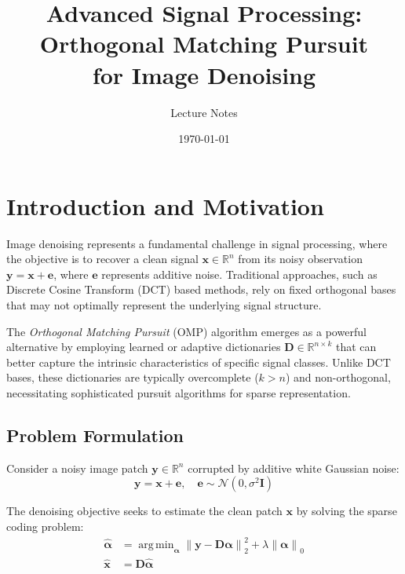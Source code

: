\documentclass[12pt]{article}
\title{Advanced Signal Processing: Orthogonal Matching Pursuit\\for Image Denoising}
\author{Lecture Notes}
\date{\today}
\renewcommand{\vec}[1]{\mathbf{#1}}
\DeclareMathOperator{\argmin}{arg\,min}
\newcommand{\norm}[1]{\left\|#1\right\|}
\theoremstyle{definition}
\begin{document}
\maketitle

\tableofcontents
\newpage


\section{Introduction and Motivation}
\label{sec:introduction}

Image denoising represents a fundamental challenge in signal processing, where the objective is to recover a clean signal $\vec{x} \in \mathbb{R}^n$ from its noisy observation $\vec{y} = \vec{x} + \vec{e}$, where $\vec{e}$ represents additive noise. Traditional approaches, such as Discrete Cosine Transform (DCT) based methods, rely on fixed orthogonal bases that may not optimally represent the underlying signal structure.

The \textit{Orthogonal Matching Pursuit} (OMP) algorithm emerges as a powerful alternative by employing learned or adaptive dictionaries $\mathbf{D} \in \mathbb{R}^{n \times k}$ that can better capture the intrinsic characteristics of specific signal classes. Unlike DCT bases, these dictionaries are typically overcomplete ($k > n$) and non-orthogonal, necessitating sophisticated pursuit algorithms for sparse representation.

\subsection{Problem Formulation}
\label{subsec:problem_formulation}

Consider a noisy image patch $\vec{y} \in \mathbb{R}^n$ corrupted by additive white Gaussian noise:
\begin{equation}
    \vec{y} = \vec{x} + \vec{e}, \quad \vec{e} \sim \mathcal{N}(0, \sigma^2 \mathbf{I})
\end{equation}

The denoising objective seeks to estimate the clean patch $\vec{x}$ by solving the sparse coding problem:
\begin{align}
    \hat{\vec{\alpha}} & = \argmin_{\vec{\alpha}} \norm{\vec{y} - \mathbf{D}\vec{\alpha}}_2^2 + \lambda \norm{\vec{\alpha}}_0 \label{eq:sparse_coding} \\
    \hat{\vec{x}}      & = \mathbf{D}\hat{\vec{\alpha}} \label{eq:reconstruction}
\end{align}
\end{document}
